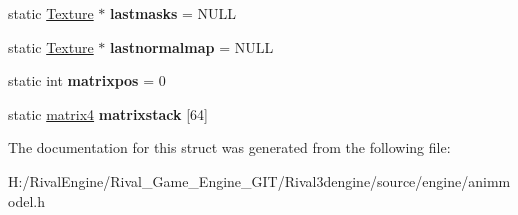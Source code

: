 \begin{DoxyCompactItemize}
static \hyperlink{struct_texture}{Texture} $\ast$ {\bfseries lastmasks} = N\+U\+LL
\item 
\mbox{\label{structanimmodel_a4aa5b2a84482b23846f662351eac7a54}} 
static \hyperlink{struct_texture}{Texture} $\ast$ {\bfseries lastnormalmap} = N\+U\+LL
\item 
\mbox{\label{structanimmodel_ac496317c2c1b464951b9a28dac25e31b}} 
static int {\bfseries matrixpos} = 0
\item 
\mbox{\label{structanimmodel_abdb8d4166cedcdba6e6be96b3b29022f}} 
static \hyperlink{structmatrix4}{matrix4} {\bfseries matrixstack} \mbox{[}64\mbox{]}
\end{DoxyCompactItemize}


The documentation for this struct was generated from the following file\+:\begin{DoxyCompactItemize}
\item 
H\+:/\+Rival\+Engine/\+Rival\+\_\+\+Game\+\_\+\+Engine\+\_\+\+G\+I\+T/\+Rival3dengine/source/engine/animmodel.\+h\end{DoxyCompactItemize}
